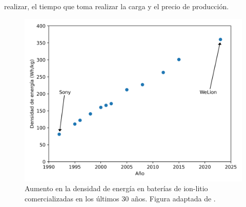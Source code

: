 realizar, el tiempo que toma realizar la carga y el 
precio de producción.
\begin{figure}[h!]
    \centering
    \includegraphics[width=.8\textwidth]{Introduccion/baterias/whkg.png}
    \caption{Aumento en la densidad de energía en baterías de ion-litio comercializadas
    en los últimos 30 años. Figura adaptada de \cite{li2023700}.}
    \label{fig:whkg}
\end{figure}

